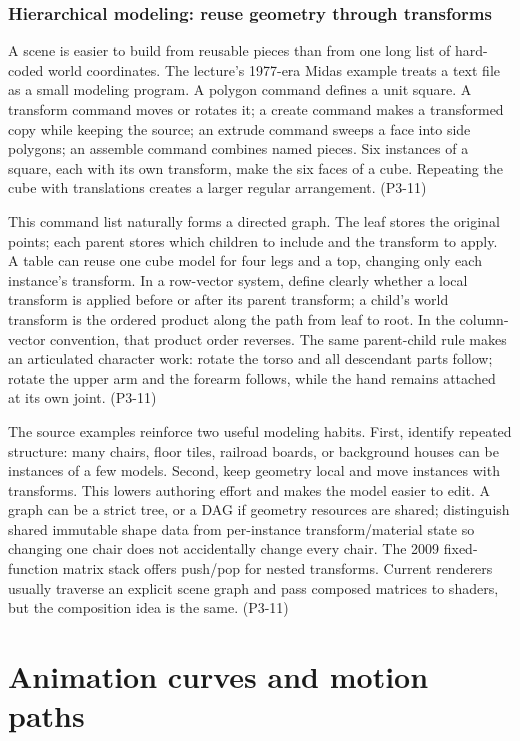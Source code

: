 \subsubsection{Hierarchical modeling: reuse geometry through transforms}\label{04-visual-computing-ii-ch029-hierarchical-modeling-reuse-geometry-through-transforms}

A scene is easier to build from reusable pieces than from one long list of hard-coded world coordinates. The lecture's 1977-era Midas example treats a text file as a small modeling program. A polygon command defines a unit square. A transform command moves or rotates it; a create command makes a transformed copy while keeping the source; an extrude command sweeps a face into side polygons; an assemble command combines named pieces. Six instances of a square, each with its own transform, make the six faces of a cube. Repeating the cube with translations creates a larger regular arrangement. (P3-11)

This command list naturally forms a directed graph. The leaf stores the original points; each parent stores which children to include and the transform to apply. A table can reuse one cube model for four legs and a top, changing only each instance's transform. In a row-vector system, define clearly whether a local transform is applied before or after its parent transform; a child's world transform is the ordered product along the path from leaf to root. In the column-vector convention, that product order reverses. The same parent-child rule makes an articulated character work: rotate the torso and all descendant parts follow; rotate the upper arm and the forearm follows, while the hand remains attached at its own joint. (P3-11)

The source examples reinforce two useful modeling habits. First, identify repeated structure: many chairs, floor tiles, railroad boards, or background houses can be instances of a few models. Second, keep geometry local and move instances with transforms. This lowers authoring effort and makes the model easier to edit. A graph can be a strict tree, or a DAG if geometry resources are shared; distinguish shared immutable shape data from per-instance transform/material state so changing one chair does not accidentally change every chair. The 2009 fixed-function matrix stack offers push/pop for nested transforms. Current renderers usually traverse an explicit scene graph and pass composed matrices to shaders, but the composition idea is the same. (P3-11)

\section{Animation curves and motion paths}\label{04-visual-computing-ii-ch029-animation-curves-and-motion-paths}

